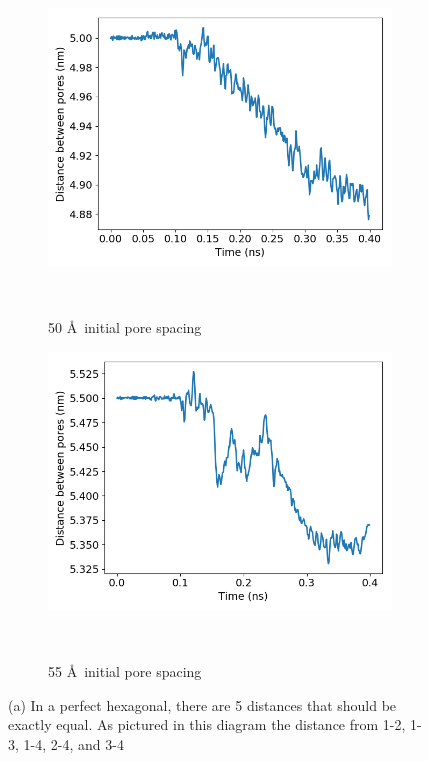 \documentclass{article}
\begin{document}
\begin{figure}[!htb]
	\begin{subfigure}{0.3\textwidth}
		\includegraphics[width=\textwidth]{p2p_50.png}\quad	
		\vspace{-1.25em}
		\caption{50 \AA~initial pore spacing}~\label{fig:p2p_50}
	\end{subfigure}
	\begin{subfigure}{0.3\textwidth}
		\includegraphics[width=\textwidth]{p2p_55.png}
		\vspace{-1.25em}
		\caption{55 \AA~initial pore spacing}~\label{fig:p2p_55}
	\end{subfigure}
	\caption{(a) In a perfect hexagonal, there are 5 distances that should be exactly
	equal. As pictured in this diagram the distance from 1-2, 1-3, 1-4, 2-4, and 3-4
}
\end{figure}
\end{document}
